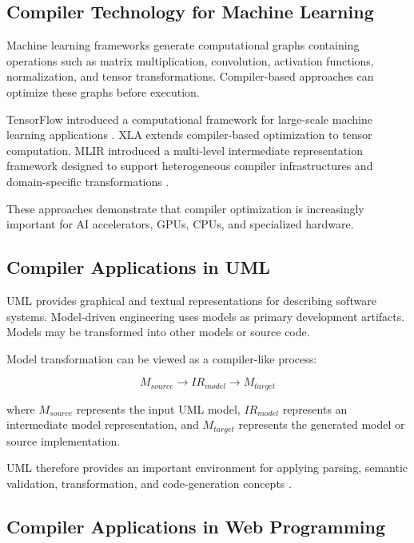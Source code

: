 \documentclass[12pt,a4paper]{article}
\begin{document}
\subsection{Compiler Technology for Machine Learning}

Machine learning frameworks generate computational graphs containing
operations such as matrix multiplication, convolution, activation functions,
normalization, and tensor transformations. Compiler-based approaches can
optimize these graphs before execution.

TensorFlow introduced a computational framework for large-scale machine
learning applications \cite{abadi2016}. XLA extends compiler-based
optimization to tensor computation. MLIR introduced a multi-level
intermediate representation framework designed to support heterogeneous
compiler infrastructures and domain-specific transformations
\cite{lattner2021}.

These approaches demonstrate that compiler optimization is increasingly
important for AI accelerators, GPUs, CPUs, and specialized hardware.

\subsection{Compiler Applications in UML}

UML provides graphical and textual representations for describing software
systems. Model-driven engineering uses models as primary development artifacts.
Models may be transformed into other models or source code.

Model transformation can be viewed as a compiler-like process:

\begin{equation}
M_{source} \rightarrow IR_{model} \rightarrow M_{target}
\end{equation}

where $M_{source}$ represents the input UML model, $IR_{model}$ represents an
intermediate model representation, and $M_{target}$ represents the generated
model or source implementation.

UML therefore provides an important environment for applying parsing,
semantic validation, transformation, and code-generation concepts
\cite{fowler2004,mellor2004}.

\subsection{Compiler Applications in Web Programming}
\end{document}

